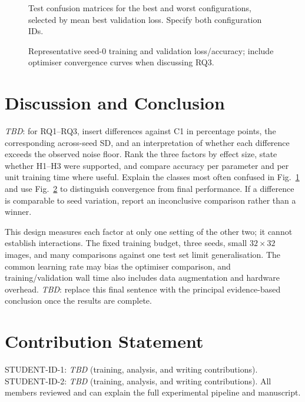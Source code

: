 \documentclass[conference,onecolumn]{IEEEtran}
\newcommand{\tbd}{\textit{TBD}}
\begin{document}
\begin{figure}[htbp]
\centering
{}
\caption{Test confusion matrices for the best and worst configurations,
selected by mean best validation loss. Specify both configuration IDs.}
\label{fig:confusion}
\end{figure}

\begin{figure}[htbp]
\centering
{}
\caption{Representative seed-0 training and validation loss/accuracy;
include optimiser convergence curves when discussing RQ3.}
\label{fig:curves}
\end{figure}

\section{Discussion and Conclusion}
\tbd{}: for RQ1--RQ3, insert differences against C1 in percentage points,
the corresponding across-seed SD, and an interpretation of whether each
difference exceeds the observed noise floor. Rank the three factors by
effect size, state whether H1--H3 were supported, and compare accuracy
per parameter and per unit training time where useful. Explain the
classes most often confused in Fig.~\ref{fig:confusion} and use
Fig.~\ref{fig:curves} to distinguish convergence from final performance.
If a difference is comparable to seed variation, report an inconclusive
comparison rather than a winner.

This design measures each factor at only one setting of the other two;
it cannot establish interactions. The fixed training budget, three seeds,
small $32\times32$ images, and many comparisons against one test set limit
generalisation. The common learning rate may bias the optimiser comparison,
and training/validation wall time also includes data augmentation and
hardware overhead. \tbd{}: replace this final sentence with the principal
evidence-based conclusion once the results are complete.

\section*{Contribution Statement}
STUDENT-ID-1: \tbd{} (training, analysis, and writing contributions).
STUDENT-ID-2: \tbd{} (training, analysis, and writing contributions).
All members reviewed and can explain the full experimental pipeline and
manuscript.
\end{document}
